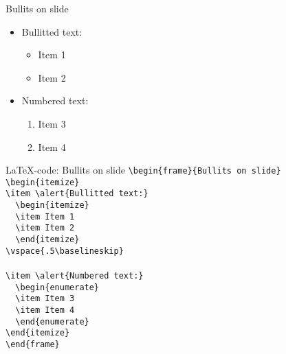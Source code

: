 \begin{frame}{Bullits on slide}
\begin{itemize}
\item \alert{Bullitted text:}
  \begin{itemize}
  \item Item 1
  \item Item 2
  \end{itemize}
\vspace{.5\baselineskip}

\item \alert{Numbered text:}
  \begin{enumerate}
  \item Item 3
  \item Item 4
  \end{enumerate}
\end{itemize}
\end{frame}

\toggleslidecolors
\begin{frame}[fragile]{\LaTeX-code: Bullits on slide}
\footnotesize
\verb|\begin{frame}{Bullits on slide}|\\
\verb|\begin{itemize}|\\
\verb|\item \alert{Bullitted text:}|\\
\verb|  \begin{itemize}|\\
\verb|  \item Item 1|\\
\verb|  \item Item 2|\\
\verb|  \end{itemize}|\\
\verb|\vspace{.5\baselineskip}|\\
\verb||\\
\verb|\item \alert{Numbered text:}|\\
\verb|  \begin{enumerate}|\\
\verb|  \item Item 3|\\
\verb|  \item Item 4|\\
\verb|  \end{enumerate}|\\
\verb|\end{itemize}|\\
\verb|\end{frame}|\\
\end{frame}
\toggleslidecolors

